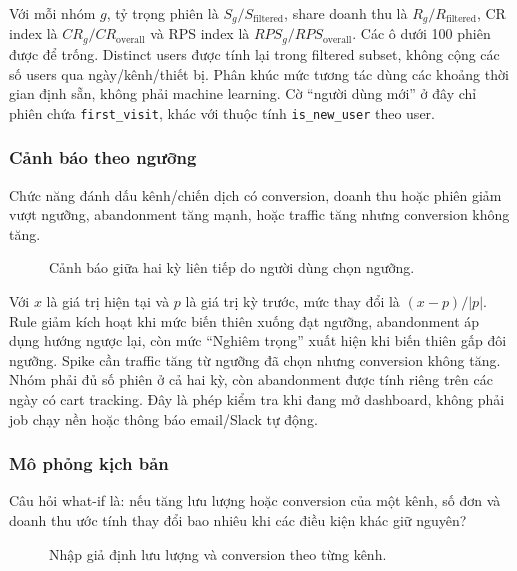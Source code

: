 Với mỗi nhóm $g$, tỷ trọng phiên là $S_g/S_{\text{filtered}}$, share doanh thu là $R_g/R_{\text{filtered}}$, CR index là $CR_g/CR_{\text{overall}}$ và RPS index là $RPS_g/RPS_{\text{overall}}$. Các ô dưới 100 phiên được để trống. Distinct users được tính lại trong filtered subset, không cộng các số users qua ngày/kênh/thiết bị. Phân khúc mức tương tác dùng các khoảng thời gian định sẵn, không phải machine learning. Cờ ``người dùng mới'' ở đây chỉ phiên chứa \texttt{first\_visit}, khác với thuộc tính \texttt{is\_new\_user} theo user.

\subsubsection{Cảnh báo theo ngưỡng}

Chức năng đánh dấu kênh/chiến dịch có conversion, doanh thu hoặc phiên giảm vượt ngưỡng, abandonment tăng mạnh, hoặc traffic tăng nhưng conversion không tăng.

\begin{figure}[H]
  \centering
  \caption{Cảnh báo giữa hai kỳ liên tiếp do người dùng chọn ngưỡng.}
  \label{fig:ui-alerts}
\end{figure}

Với $x$ là giá trị hiện tại và $p$ là giá trị kỳ trước, mức thay đổi là $(x-p)/|p|$. Rule giảm kích hoạt khi mức biến thiên xuống đạt ngưỡng, abandonment áp dụng hướng ngược lại, còn mức ``Nghiêm trọng'' xuất hiện khi biến thiên gấp đôi ngưỡng. Spike cần traffic tăng từ ngưỡng đã chọn nhưng conversion không tăng. Nhóm phải đủ số phiên ở cả hai kỳ, còn abandonment được tính riêng trên các ngày có cart tracking. Đây là phép kiểm tra khi đang mở dashboard, không phải job chạy nền hoặc thông báo email/Slack tự động.

\subsubsection{Mô phỏng kịch bản}

Câu hỏi what-if là: nếu tăng lưu lượng hoặc conversion của một kênh, số đơn và doanh thu ước tính thay đổi bao nhiêu khi các điều kiện khác giữ nguyên?

\begin{figure}[H]
  \centering
  \caption{Nhập giả định lưu lượng và conversion theo từng kênh.}
  \label{fig:ui-scenario-editor}
\end{figure}

